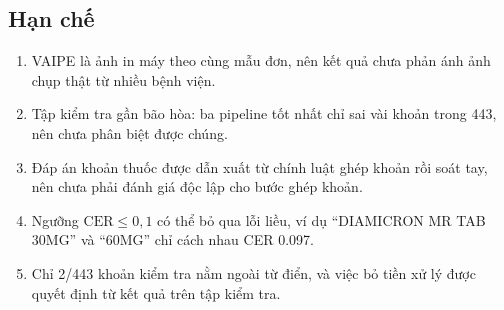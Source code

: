 \subsection{Hạn chế}
\begin{enumerate}[label=(\arabic*), leftmargin=2em, itemsep=0.15em, topsep=0.3em]
  \item VAIPE là ảnh in máy theo cùng mẫu đơn, nên kết quả chưa phản ánh ảnh chụp thật từ nhiều bệnh viện.
  \item Tập kiểm tra gần bão hòa: ba pipeline tốt nhất chỉ sai vài khoản trong 443, nên chưa phân biệt được chúng.
  \item Đáp án khoản thuốc được dẫn xuất từ chính luật ghép khoản rồi soát tay, nên chưa phải đánh giá độc lập cho bước ghép khoản.
  \item Ngưỡng $\text{CER}\le0{,}1$ có thể bỏ qua lỗi liều, ví dụ ``DIAMICRON MR TAB 30MG'' và ``60MG'' chỉ cách nhau CER \num{0.097}.
  \item Chỉ 2/443 khoản kiểm tra nằm ngoài từ điển, và việc bỏ tiền xử lý được quyết định từ kết quả trên tập kiểm tra.
\end{enumerate}
